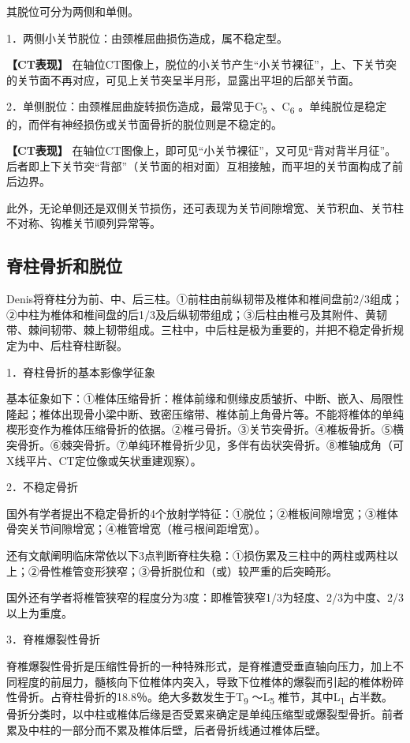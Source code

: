 其脱位可分为两侧和单侧。

1．两侧小关节脱位：由颈椎屈曲损伤造成，属不稳定型。

\textbf{【CT表现】}
在轴位CT图像上，脱位的小关节产生“小关节裸征”，上、下关节突的关节面不再对应，可见上关节突呈半月形，显露出平坦的后部关节面。

2．单侧脱位：由颈椎屈曲旋转损伤造成，最常见于C\textsubscript{5}
、C\textsubscript{6}
。单纯脱位是稳定的，而伴有神经损伤或关节面骨折的脱位则是不稳定的。

\textbf{【CT表现】}
在轴位CT图像上，即可见“小关节裸征”，又可见“背对背半月征”。后者即上下关节突“背部”（关节面的相对面）互相接触，而平坦的关节面构成了前后边界。

此外，无论单侧还是双侧关节损伤，还可表现为关节间隙增宽、关节积血、关节柱不对称、钩椎关节顺列异常等。

\subsection{脊柱骨折和脱位}

Denis将脊柱分为前、中、后三柱。①前柱由前纵韧带及椎体和椎间盘前2/3组成；②中柱为椎体和椎间盘的后1/3及后纵韧带组成；③后柱由椎弓及其附件、黄韧带、棘间韧带、棘上韧带组成。三柱中，中后柱是极为重要的，并把不稳定骨折规定为中、后柱脊柱断裂。

1．脊柱骨折的基本影像学征象

基本征象如下：①椎体压缩骨折：椎体前缘和侧缘皮质皱折、中断、嵌入、局限性隆起；椎体出现骨小梁中断、致密压缩带、椎体前上角骨片等。不能将椎体的单纯楔形变作为椎体压缩骨折的依据。②椎弓骨折。③关节突骨折。④椎板骨折。⑤横突骨折。⑥棘突骨折。⑦单纯环椎骨折少见，多伴有齿状突骨折。⑧椎轴成角（可X线平片、CT定位像或矢状重建观察）。

2．不稳定骨折

国外有学者提出不稳定骨折的4个放射学特征：①脱位；②椎板间隙增宽；③椎体骨突关节间隙增宽；④椎管增宽（椎弓根间距增宽）。

还有文献阐明临床常依以下3点判断脊柱失稳：①损伤累及三柱中的两柱或两柱以上；②骨性椎管变形狭窄；③骨折脱位和（或）较严重的后突畸形。

国外还有学者将椎管狭窄的程度分为3度：即椎管狭窄1/3为轻度、2/3为中度、2/3以上为重度。

3．脊椎爆裂性骨折

脊椎爆裂性骨折是压缩性骨折的一种特殊形式，是脊椎遭受垂直轴向压力，加上不同程度的前屈力，髓核向下位椎体内突入，导致下位椎体的爆裂而引起的椎体粉碎性骨折。占脊柱骨折的18.8％。绝大多数发生于T\textsubscript{9}
～L\textsubscript{5} 椎节，其中L\textsubscript{1}
占半数。骨折分类时，以中柱或椎体后缘是否受累来确定是单纯压缩型或爆裂型骨折。前者累及中柱的一部分而不累及椎体后壁，后者骨折线通过椎体后壁。

